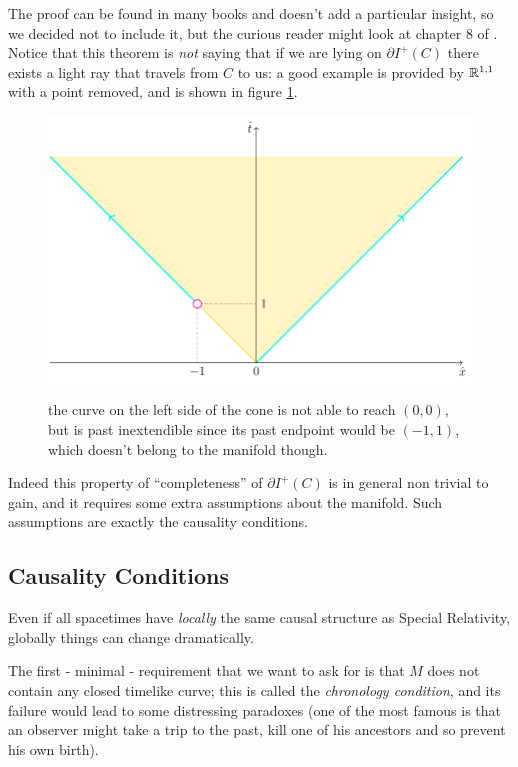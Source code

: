 The proof can be found in many books and doesn't add a particular insight, so we 
decided not to include it, but the curious reader might look at chapter \(8\) 
of \cite{wald2010general}. 
Notice that this theorem is \emph{not} saying that if we are lying on \(\partial I^+(C)\) 
there exists a light ray that travels from \(C\) to us: a good example is provided by
\({\mathbb{R}}^{1,1}\) with a point removed, and is shown in figure \ref{fig:inextendible-but-incomplete}.
\begin{figure}
	\centering
	\caption{the curve on the left side of the cone is not able to reach \((0,0)\), but
	is past inextendible since its past endpoint would be \((-1, 1)\), which doesn't belong
	to the manifold though.}
	\includegraphics[scale=0.7]{Immagini/inextendible-but-incomplete/inextendible-but-incomplete.pdf}
	\label{fig:inextendible-but-incomplete}
\end{figure}
Indeed this property of ``completeness'' of \(\partial I^+(C)\) is in general non trivial to gain, and it requires some extra assumptions about the manifold. Such assumptions are exactly the causality conditions.

\subsection{Causality Conditions}
Even if all spacetimes have \emph{locally} the same causal structure as Special Relativity, globally things can change dramatically.

The first - minimal - requirement that we want to ask for is that \(M\) does not contain any  closed timelike curve; this is called the \emph{chronology condition}, and its failure would lead to some distressing paradoxes (one of the most famous is that an observer might take a trip to the past, kill one of his ancestors and so prevent his own birth).

